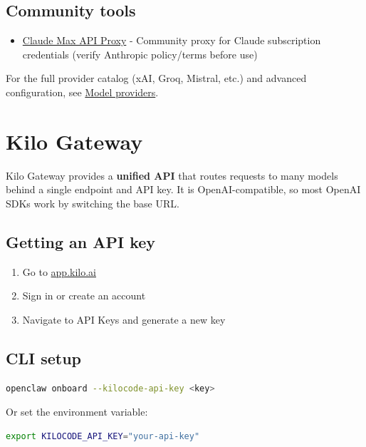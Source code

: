\subsection{Community tools}


\begin{itemize}
  \item \href{/providers/claude-max-api-proxy}{Claude Max API Proxy} - Community proxy for Claude subscription credentials (verify Anthropic policy/terms before use)
\end{itemize}


For the full provider catalog (xAI, Groq, Mistral, etc.) and advanced configuration,
see \href{/concepts/model-providers}{Model providers}.


\clearpage

\section{Kilo Gateway}


Kilo Gateway provides a \textbf{unified API} that routes requests to many models behind a single
endpoint and API key. It is OpenAI-compatible, so most OpenAI SDKs work by switching the base URL.

\subsection{Getting an API key}


\begin{enumerate}
  \item Go to \href{https://app.kilo.ai}{app.kilo.ai}
  \item Sign in or create an account
  \item Navigate to API Keys and generate a new key
\end{enumerate}


\subsection{CLI setup}


\begin{lstlisting}[language=bash]
openclaw onboard --kilocode-api-key <key>
\end{lstlisting}


Or set the environment variable:

\begin{lstlisting}[language=bash]
export KILOCODE_API_KEY="your-api-key"
\end{lstlisting}


